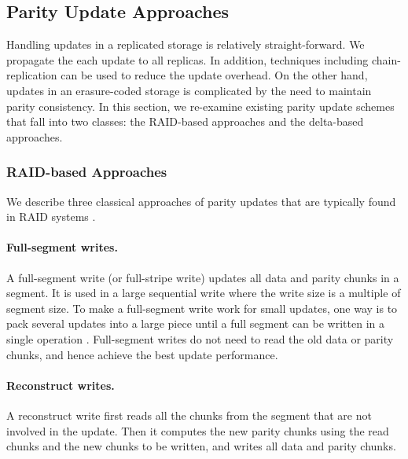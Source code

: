 \subsection{Parity Update Approaches}

Handling updates in a replicated storage is relatively straight-forward. We 
propagate the each update to all replicas. In addition, techniques including 
chain-replication \cite{vanRenesse04} can be used to reduce the update overhead.
On the other hand, updates in an erasure-coded storage is complicated by the
need to maintain parity consistency.  
In this section, we re-examine existing parity update schemes
that fall into two classes: the RAID-based approaches and the delta-based
approaches. 


\subsubsection{RAID-based Approaches}

We describe three classical approaches of parity updates that are typically
found in RAID systems \cite{chen95,thomasian05}. 


\paragraph{Full-segment writes.} A full-segment write (or full-stripe write)
updates all data and parity chunks in a segment. 
It is used in a large sequential
write where the write size is a multiple of segment size.  To make a
full-segment write work for small updates, one way is to pack several updates
into a large piece until a full segment can be written in a single operation 
\cite{menon95}. Full-segment writes do not need to read the old data or parity
chunks, and hence achieve the best update performance.


\paragraph{Reconstruct writes.} A reconstruct write first reads all the chunks
from the segment that are not involved in the update.  Then it computes the new parity chunks
using the read chunks and the new chunks to be written, and writes all data
and parity chunks. 

